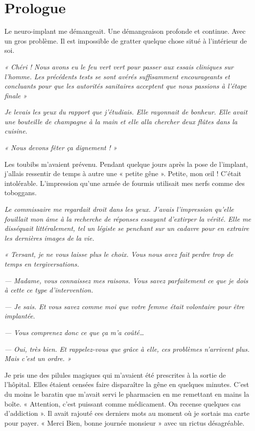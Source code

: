 \chapter{Prologue}

Le neuro-implant me démangeait. Une démangeaison profonde et continue. Avec un gros problème. Il est impossible de 
gratter quelque chose situé à l'intérieur de soi.

\emph{« Chéri ! Nous avons eu le feu vert vert pour passer aux essais cliniques sur l'homme. Les précédents tests se 
sont avérés suffisamment encourageants et concluants pour que les autorités sanitaires acceptent que nous passions à 
l'étape finale »}

\emph{Je levais les yeux du rapport que j'étudiais. Elle rayonnait de bonheur. Elle avait une bouteille de champagne à 
la main et elle alla chercher deux flûtes dans la cuisine.}

\emph{« Nous devons fêter ça dignement ! »}

Les toubibs m'avaient prévenu. Pendant quelque jours après la pose de l'implant, j'allais ressentir de temps à autre
une « petite gêne ». Petite, mon œil ! C'était intolérable. L'impression qu'une armée de fourmis utilisait mes nerfs
comme des toboggans. 

\emph{Le commissaire me regardait droit dans les yeux. J'avais l'impression qu'elle fouillait mon âme à la recherche de 
réponses essayant d'extirper la vérité. Elle me disséquait littéralement, tel un légiste se penchant sur un cadavre pour 
en extraire les dernières images de la vie.}

\emph{« Tersant, je ne vous laisse plus le choix. Vous nous avez fait perdre trop de temps en tergiversations.}

\emph{— Madame, vous connaissez mes raisons. Vous savez parfaitement ce que je dois à cette ce type d'intervention.}

\emph{— Je sais. Et vous savez comme moi que votre femme était volontaire pour être implantée.}

\emph{— Vous comprenez donc ce que ça m'a coûté…}

\emph{— Oui, très bien. Et rappelez-vous que grâce à elle, ces problèmes n'arrivent plus. Mais c'est un ordre. »}

Je pris une des pilules magiques qui m'avaient été prescrites à la sortie de l'hôpital. Elles étaient censées faire 
disparaître la gêne en quelques minutes. C'est du moins le baratin que m'avait servi le pharmacien en me remettant en 
mains la boîte. « Attention, c'est puissant comme médicament. On recense quelques cas d'addiction ». Il avait rajouté 
ces derniers mots au moment où je sortais ma carte pour payer. « Merci Bien, bonne journée monsieur » avec un rictus 
désagréable.

